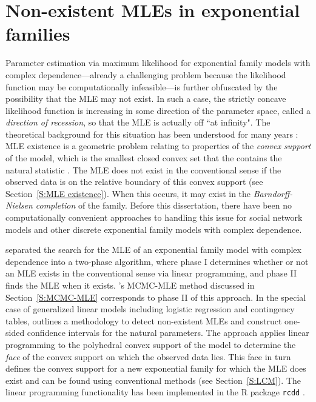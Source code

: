 \section{Non-existent MLEs in exponential families} \label{S:Non-existent MLE}
Parameter estimation via maximum likelihood for exponential family models with 
complex dependence---already a 
challenging problem because the likelihood function may be computationally 
infeasible---is further obfuscated by the possibility that the MLE
may not exist.  
In such a case, the strictly concave likelihood function is
increasing in some direction of the parameter space, called a 
\emph{direction of recession}, so that the MLE is actually off ``at infinity".
The theoretical background 
for this situation has been understood for many years 
\citep{Barndorff,Brown:1986}: MLE existence is a
geometric problem relating to properties of the \emph{convex support} of the model,
which is  the smallest closed convex set 
that the contains the natural statistic \citep{Geyer:gdor}.  
The MLE does not exist in the conventional sense if the 
observed data is on the relative boundary of this 
convex support (see Section~\ref{S:MLE existence}).
When this occurs, 
it may exist in the \emph{Barndorff-Nielsen completion} of the family.
Before this dissertation, there have been no 
computationally convenient approaches to handling this issue for social network models
and other discrete exponential family models with complex dependence.

\citet{Geyer:1992} separated the search for the MLE of an exponential family model
with complex dependence into a two-phase algorithm, 
where phase I determines whether or not an MLE exists in the conventional 
sense via linear programming, and phase II finds the MLE when it exists.
\citeauthor{Geyer:1992}'s MCMC-MLE method discussed in Section~\ref{S:MCMC-MLE} corresponds to phase II of
this approach.
In the special case of generalized linear models including logistic regression and contingency 
tables, \citet{Geyer:gdor} outlines a methodology to detect non-existent MLEs and construct 
one-sided confidence intervals for the natural parameters.
The approach applies linear programming to the polyhedral convex support of 
the model to determine the \emph{face} of the convex support 
on which the observed data lies.  
This face in turn defines the convex support for a new exponential family for which the MLE 
does exist and can be found using conventional methods (see Section~\ref{S:LCM}).
The linear programming 
functionality has been implemented in the R package \texttt{rcdd} \citep*{rcdd:R}.

